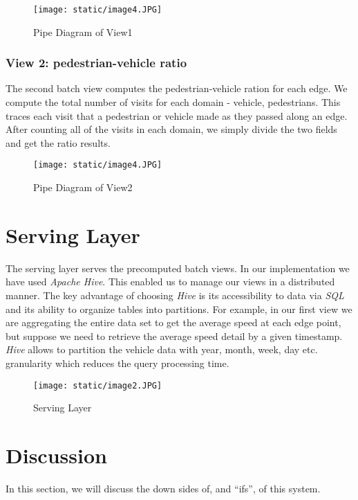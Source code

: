\documentclass[format=acmsmall, review=false, screen=true]{acmart}
\begin{document}
\begin{figure}[H]
  \texttt{[image: static/image4.JPG]}
  \caption{Pipe Diagram of View1}
  \label{fig:verticalpartitioning-diagram}
\end{figure}

\subsubsection{View 2: pedestrian-vehicle ratio}
The second batch view computes the pedestrian-vehicle ration for each edge. We compute the total number of visits for each domain - vehicle, pedestrians. This traces each visit that a pedestrian or vehicle made as they passed along an edge. After counting all of the visits in each domain, we simply divide the two fields and get the ratio results.

\begin{figure}[H]
  \texttt{[image: static/image4.JPG]}
  \caption{Pipe Diagram of View2}
  \label{fig:verticalpartitioning-diagram}
\end{figure}

\section{Serving Layer}
The serving layer serves the precomputed batch views. In our implementation we have used \textit{Apache Hive}. This enabled us to manage our views in a distributed manner. The key advantage of choosing \textit{Hive} is its accessibility to data via \textit{SQL} and its ability to organize tables into partitions. For example, in our first view we are aggregating the entire data set to get the average speed at each edge point, but suppose we need to retrieve the average speed detail by a given timestamp. \textit{Hive} allows to partition the vehicle data with year, month, week, day etc. granularity which reduces the query processing time.

\begin{figure}[H]
  \texttt{[image: static/image2.JPG]}
  \caption{Serving Layer}
  \label{fig:verticalpartitioning-diagram}
\end{figure}

\section{Discussion}
In this section, we will discuss the down sides of, and “ifs”, of this system.
\end{document}
